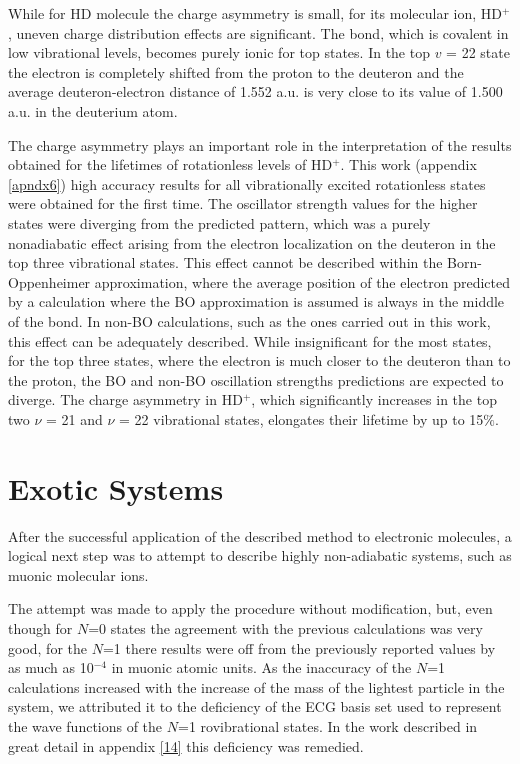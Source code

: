 While for HD molecule the charge asymmetry is small, for its molecular ion, HD$^+$,
uneven charge distribution effects are significant. The bond, which is covalent in low
vibrational levels, becomes purely ionic for top states. In the top $v$ = 22 state the 
electron is completely shifted from the proton to the deuteron and the average 
deuteron-electron distance of 1.552 a.u. is very close to its value of 1.500 a.u.
in the deuterium atom.

The charge asymmetry plays an important role in the interpretation of the results
obtained for the lifetimes of rotationless levels of HD$^+$. This work (appendix
\ref{apndx6}) high accuracy results for all vibrationally excited rotationless states 
were obtained for the first time. The oscillator strength values for the higher
states were diverging from the predicted pattern, which was a 
purely nonadiabatic effect arising from the electron localization on the
deuteron in the top three vibrational states. This effect cannot be described within 
the Born-Oppenheimer approximation, where the average position of the electron predicted 
by a calculation where the BO approximation is assumed is always in the middle of the bond. 
In non-BO calculations, such as the ones carried out in this work, this effect can be
adequately described. While insignificant for the most states, for the top three states, 
where the electron is much closer to the deuteron than to the proton, the BO and non-BO oscillation strengths predictions are expected to diverge.
The charge asymmetry in HD$^+$, which significantly increases in the top two 
$ν$ = 21 and $ν$ = 22 vibrational states, elongates their lifetime by up to 15$\%$.

\section{Exotic Systems}

After the successful application of the described method to electronic molecules,
a logical next step was to attempt to describe highly non-adiabatic systems, such
as muonic molecular ions. 

The attempt was  made to apply the procedure without modification, but, even though 
for $N$=0 states the agreement with the previous calculations was very good, 
for the $N$=1 there results were off from the previously reported values by 
as much as 10$^{−4}$ in muonic atomic units.
As the inaccuracy of the $N$=1 calculations increased with the increase of the 
mass of the lightest particle in the system, we attributed it to the deficiency 
of the ECG basis set used to represent the wave functions of the $N$=1 
rovibrational states. In the work described in great detail in appendix \ref{14} 
this deficiency was remedied.

